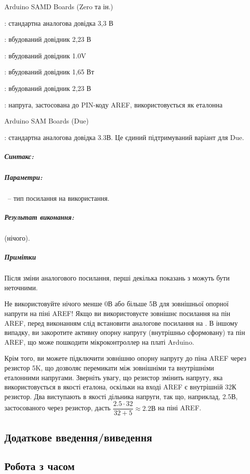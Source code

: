 \documentclass[12pt,a4paper]{report}  %
\begin{document}
Arduino SAMD Boards (Zero та ін.)

    : стандартна аналогова довідка 3,3 В

    : вбудований довідник 2,23 В

    : вбудований довідник 1.0V

    : вбудований довідник 1,65 Вт

    : вбудований довідник 2,23 В

    : напруга, застосована до PIN-коду AREF, використовується як еталонна

Arduino SAM Boards (Due)

    : стандартна аналогова довідка 3.3В. Це єдиний підтримуваний варіант для Due.
    
\subparagraph{Синтакс:} 
\subparagraph{Параметри:}

~-- тип посилання на використання.
\subparagraph{Результат виконання:}  (нічого).

\subparagraph{Примітки}

Після зміни аналогового посилання, перші декілька показань з  можуть бути неточними.

Не використовуйте нічого менше 0В або більше 5В для зовнішньої опорної напруги на піні AREF! Якщо ви використовуєте зовнішнє посилання на пін AREF, перед виконанням  слід встановити аналогове посилання на . В іншому випадку, ви закоротите активну опорну напругу (внутрішньо сформовану) та пін AREF, що може пошкодити мікроконтроллер на платі Arduino.

Крім того, ви можете підключити зовнішню опорну напругу до піна AREF через резистор 5K, що дозволяє перемикати між зовнішніми та внутрішніми еталонними напругами. Зверніть увагу, що резистор змінить напругу, яка використовується в якості еталона, оскільки на вході AREF є внутрішній 32К резистор. Два виступають в якості дільника напруги, так що, наприклад, 2.5В, застосованого через резистор, дасть $\dfrac{2.5 \cdot 32}{32 + 5} \approx 2.2\text{В}$ на піні AREF.

\subsection{Додаткове введення/виведення}
\subsection{Робота з часом}
\end{document}
